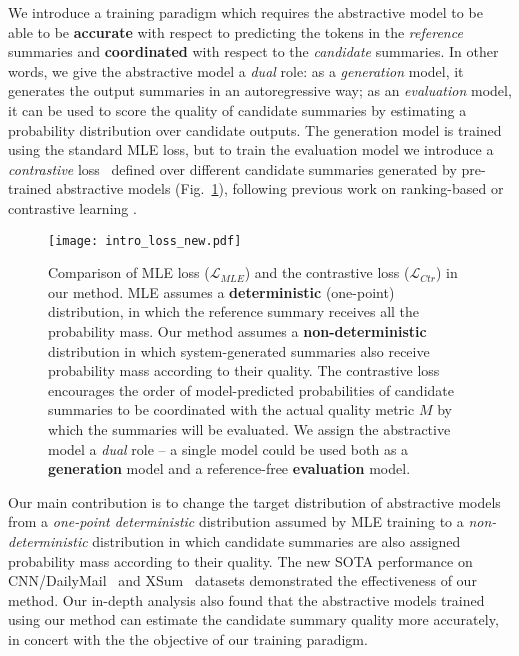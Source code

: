 \documentclass[11pt]{article}
\begin{document}
We introduce a training paradigm which requires the abstractive model to be able to be \textbf{accurate} with respect to predicting the tokens in the \textit{reference} summaries and \textbf{coordinated} with respect to the \textit{candidate} summaries.
In other words, we give the abstractive model a \textit{dual} role: as a \emph{generation} model, it generates the output summaries in an autoregressive way; as an \emph{evaluation} model, it can be used to score the quality of candidate summaries by estimating a probability distribution over candidate outputs.
The generation model is trained using the standard MLE loss, but to train the evaluation model we introduce a \textit{contrastive} loss~\citep{10.1109/CVPR.2006.100} defined over different candidate summaries generated by pre-trained abstractive models (Fig.~\ref{fig:intro}), following previous work on ranking-based or contrastive learning \citep{hopkins-may-2011-tuning, zhong-etal-2020-extractive, liu-etal-2021-refsum}.


\begin{figure}[t!]
    \centering
    \texttt{[image: intro\_loss\_new.pdf]}
    \caption{Comparison of MLE loss ($\mathcal{L}_{MLE}$) and the contrastive loss ($\mathcal{L}_{Ctr}$) in our method.
    MLE assumes a \textbf{deterministic} (one-point) distribution, in which the reference summary receives all the probability mass.
    Our method assumes a \textbf{non-deterministic} distribution in which system-generated summaries also receive probability mass according to their quality.
    The contrastive loss encourages the order of model-predicted probabilities of candidate summaries to be coordinated with the actual quality metric $M$ by which the summaries will be evaluated.
    We assign the abstractive model a \textit{dual} role -- a single model could be used both as a \textbf{generation} model and a reference-free \textbf{evaluation} model.}
    \label{fig:intro}
\end{figure}


Our main contribution is to change the target distribution of abstractive models from a \textit{one-point deterministic} distribution assumed by MLE training to a \textit{non-deterministic} distribution in which candidate summaries are also assigned probability mass according to their quality.
The new SOTA performance on CNN/DailyMail~\citep{10.5555/2969239.2969428} and XSum~\citep{narayan-etal-2018-dont} datasets demonstrated the effectiveness of our method.
Our in-depth analysis also found that the abstractive models trained using our method can estimate the candidate summary quality more accurately, in concert with the the objective of our training paradigm.
\end{document}
